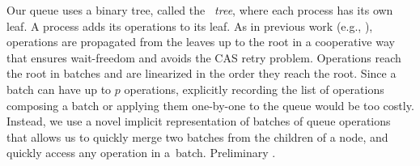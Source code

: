 Our queue uses a binary tree, called the \emph{\ordering\ tree}, where each process has its own leaf.
A process adds its operations to its leaf.
As in previous work (e.g., \cite{DBLP:conf/stoc/AfekDT95,DBLP:conf/fsttcs/JayantiP05}), operations are propagated from the leaves up to the root in a cooperative way that ensures wait-freedom
and avoids the CAS retry problem.
Operations reach the root in batches and are linearized in the order they reach the root.
Since a batch can have up to $p$ operations, explicitly recording the list of operations composing a batch
or applying them one-by-one to the queue would be too costly.
Instead, we use a novel implicit representation of batches
of queue operations that allows us to quickly merge two batches from the children of a node,
and quickly access any  operation in a~batch.
Preliminary .
